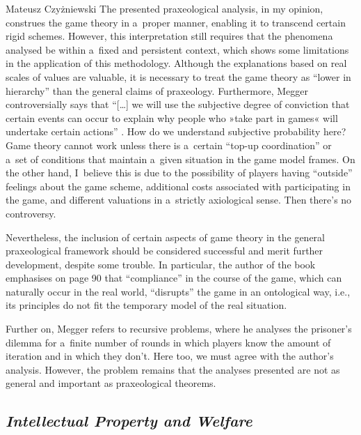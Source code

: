 \begin{newrevengenv}{Mateusz Czyżniewski}
The presented praxeological analysis, in my opinion, construes the game theory in a~proper manner, enabling it to transcend certain rigid schemes. However, this interpretation still requires that the phenomena analysed be within a~fixed and persistent context, which shows some limitations in the application of this methodology. Although the explanations based on real scales of values are valuable, it is necessary to treat the game theory as ``lower in hierarchy'' than the general claims of praxeology. Furthermore, Megger controversially says that ``[…] we will use the subjective degree of conviction that certain events can occur to explain why people who »take part in games« will undertake certain actions'' 
\parencite[][p.92]{megger_sprawiedliwosc_2021}. %
 How do we understand subjective probability here? Game theory cannot work unless there is a~certain ``top-up coordination'' or a~set of conditions that maintain a~given situation in the game model frames. On the other hand, I~believe this is due to the possibility of players having ``outside'' feelings about the game scheme, additional costs associated with participating in the game, and different valuations in a~strictly axiological sense. Then there's no controversy.



Nevertheless, the inclusion of certain aspects of game theory in the general praxeological framework should be considered successful and merit further development, despite some trouble. In particular, the author of the book emphasises on page 90 that ``compliance'' in the course of the game, which can naturally occur in the real world, ``disrupts'' the game in an ontological way, i.e., its principles do not fit the temporary model of the real situation.



Further on, Megger 
\parencite*[][pp.91–93]{megger_sprawiedliwosc_2021} %
 refers to recursive problems, where he analyses the prisoner's dilemma for a~finite number of rounds in which players know the amount of iteration and in which they don't. Here too, we must agree with the author's analysis. However, the problem remains that the analyses presented are not as general and important as praxeological theorems.



\subsection{\itshape Intellectual Property and Welfare}




\end{newrevengenv}
